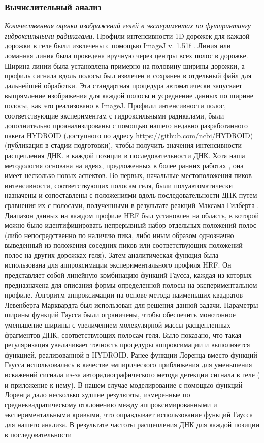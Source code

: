 \subsubsection{Вычислительный анализ}
\emph{Количественная оценка изображений гелей в экспериментах по футпринтингу гидроксильными радикалами}. Профили интенсивности 1D дорожек для каждой дорожки в геле были извлечены с помощью ImageJ v. 1.51f \cite{schneider_nih_2012}. Линия или ломанная линия была проведена вручную через центры всех полос в дорожке. Ширина линии была установлена примерно на половину ширины дорожки, а профиль сигнала вдоль полосы был извлечен и сохранен в отдельный файл для дальнейшей обработки. Эта стандартная процедура автоматически запускает выпрямление изображения для каждой полосы и усреднение данных по ширине полосы, как это реализовано в ImageJ. Профили интенсивности полос, соответствующие экспериментам с гидроксильными радикалами, были дополнительно проанализированы с помощью нашего недавно разработанного пакета HYDROID (доступного по адресу \url{https://github.com/ncbi/HYDROID}) (публикация в стадии подготовки), чтобы получить значения интенсивности расщепления ДНК. в каждой позиции в последовательности ДНК. Хотя наша методология основана на идеях, предложенных в более ранних работах \cite{shadle_quantitative_1997,takamoto_semi-automated_2004,das_safa_2005}, она имеет несколько новых аспектов. Во-первых, начальные местоположения пиков интенсивности, соответствующих полосам геля, были полуавтоматически назначены и сопоставлены с положениями вдоль последовательности ДНК путем сравнения их с полосами, полученными в результате реакций Максама-Гилберта \cite{jain_footprinting_2008-1}. Диапазон данных на каждом профиле HRF был установлен на область, в которой можно было идентифицировать непрерывный набор отдельных положений полос (либо непосредственно по наличию пика, либо иным образом однозначно выведенный из положения соседних пиков или соответствующих положений полос на других дорожках геля). Затем аналитическая функция была использована для аппроксимации экспериментального профиля HRF. Он представляет собой линейную комбинацию функций Гаусса, каждая из которых предназначена для описания формы определенной полосы на экспериментальном профиле. Алгоритм аппроксимации на основе метода наименьших квадратов Левенберга-Марквардта был использован для решения данной задачи. Параметры ширины функций Гаусса были ограничены, чтобы обеспечить монотонное уменьшение ширины с увеличением молекулярной массы расщепленных фрагментов ДНК, соответствующих полосам геля. Было показано, что такая регуляризация увеличивает точность процедуры аппроксимации и выполняется функцией, реализованной в HYDROID. Ранее функции Лоренца вместо функций Гаусса использовались в качестве эмпирического приближения для уменьшения искажений сигнала из-за авторадиографического метода детекции сигнала в геле (\cite{shadle_quantitative_1997} и приложение к нему). В нашем случае моделирование с помощью функций Лоренца дало несколько худшие результаты, измеренные по среднеквадратическому отклонению между аппроксимированными и экспериментальными кривыми, что оправдывает использование функций Гаусса для нашего анализа. В результате частоты расщепления ДНК для каждой позиции в последовательности 